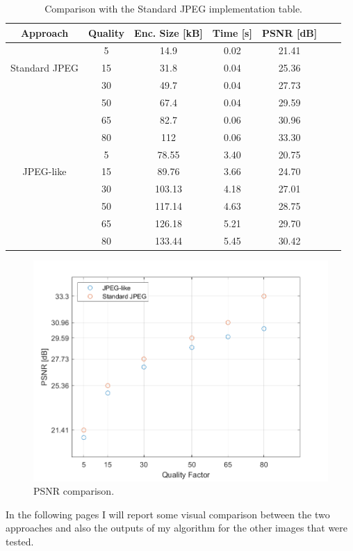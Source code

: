 \documentclass[14pt,a4paper]{extarticle}
\begin{document}
\begin{center}
\begin{table}[h!]
  \centering
\begin{tabular}{ |c|c|c|c|c|c|c| } 
\hline
Approach & Quality & Enc. Size [kB] & Time [s] & PSNR [dB] \\
\hline
\multirow{3}{4.2em}{Standard JPEG} 
& 5 & 14.9 & 0.02 & 21.41 \\ 
& 15 & 31.8 & 0.04 & 25.36\\ 
& 30 & 49.7 & 0.04 & 27.73 \\ 
& 50 & 67.4 & 0.04 & 29.59  \\ 
& 65 & 82.7 & 0.06 & 30.96 \\
& 80 & 112 & 0.06 & 33.30\\
\hline
\multirow{3}{4.2em}{JPEG-like}
& 5 & 78.55 & 3.40 & 20.75\\ 
& 15 & 89.76 & 3.66 & 24.70\\ 
& 30 & 103.13 &  4.18 & 27.01 \\ 
& 50 & 117.14 & 4.63 & 28.75 \\ 
& 65 & 126.18 & 5.21 & 29.70 \\
& 80 & 133.44 &  5.45 & 30.42 \\
\hline
\end{tabular}
\caption{Comparison with the Standard JPEG implementation table.}
\label{table:jpegcomp}
\end{table}
\end{center}
\vspace{-10mm}


\begin{figure}[H]
\includegraphics[width=0.7\linewidth, center]{jpegcomp.png} 
\caption{PSNR comparison.}
\label{fig:psnrcomp}
\end{figure}


In the following pages I will report some visual comparison between the two approaches and also the outputs of my algorithm for the other images that were tested.
\end{document}
